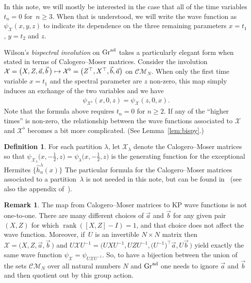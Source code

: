 \documentclass[pdftex]{sigma}
\numberwithin{equation}{section}
\theoremstyle{definition}
\newtheorem{Definition}[Theorem]{Definition}
\newtheorem{Remark}[Theorem]{Remark}
\def\X{\mathcal{X}}
\def\CM{\mathcal{C\!M}}
\begin{document}
In this note, we will mostly be interested in the case that all of the
time variables $t_n=0$ for~$n\geq 3$.
When that is understood, we will write the wave function as $\psi_{\X}(x,y,z)$ to
indicate its dependence on the three remaining parameters $x=t_1$, $y=t_2$ and $z$.


Wilson's
\textit{bispectral involution} on ${\rm Gr}^{\rm ad}$ \cite{WilsonBisp}
takes a particularly elegant form when stated in terms of Calogero--Moser matrices.
Consider the involution $\X=\bigl(X,Z,\vec a,\vec b\,\bigr)\mapsto\X^{\flat}=\smash{\bigl(Z^{\top},X^{\top},\vec b,\vec a\bigr)}$
on $\CM_N$.
When only the first time variable $x=t_1$ and the
 spectral parameter are $z$ non-zero,
 this map simply induces an exchange of the two variables
 \cite{WilsonCM} and we have%
\begin{gather}
 \psi_{\X^{\flat}}(x,0,z)=\psi_{\X}(z,0,x).\label{eqn:bi0}
\end{gather}
Note that the formula above requires $t_n=0$ for
$n\geq 2$. If any of the ``higher times'' is non-zero, the
relationship between the wave functions associated to $\X$ and
$\X^\flat$ becomes a bit more complicated. (See Lemma~\ref{lem:bispy}.)

 \begin{Definition}
For each partition $\lambda$, let $\X_{\lambda}$ denote the
Calogero--Moser matrices so that $\psi_{\X_{\lambda}}\bigl(x,-\tfrac{1}{2},z\bigr)=\psi_{\lambda}\bigl(x,-\tfrac{1}{2},z\bigr)$ is the
 generating function for the exceptional Hermites $\big\{\hat h_n^{\lambda}(x)\big\}$
The particular formula for the Calogero--Moser matrices associated to a partition~$\lambda$ is not needed in this note,
but can be found in~\cite{PThesis, PalusoKasman} (see also the appendix of~\cite{WilsonCM}).
 \end{Definition}

 \begin{Remark}
 The map from Calogero--Moser matrices to KP wave functions is not
 one-to-one. There are many different choices of $\vec a $ and
 $\vec b$ for any given pair $(X,Z)$ for which ${\operatorname{rank}([X,Z]-I)=1}$,
 and that choice does not affect the wave function. Moreover, if~$U$
 is an invertible $N\times N$ matrix then $\X=\bigl(X,Z,\vec a,\vec b\,\bigr)$ and
 $U\X U^{-1}=\bigl(UXU^{-1},UZU^{-1},\bigl(U^{-1}\bigr)^{\top}\vec a,U\vec b\,\bigr)$ yield exactly the same wave function
 $\psi_{\X}=\psi_{U\X U^{-1}}$. So, to have a
 bijection between the union of the sets $\CM_N$ over all natural
 numbers $N$ and ${\rm Gr}^{\rm ad}$ one needs to ignore $\vec a$ and $\vec
 b$ and then quotient out
 by this group action.
 \end{Remark}
\end{document}
